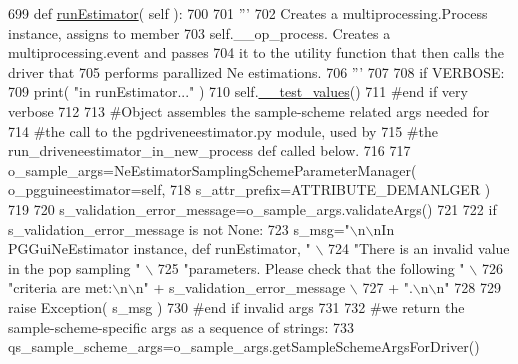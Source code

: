 \begin{DoxyCode}
699     \textcolor{keyword}{def }\hyperlink{classnegui_1_1pgguineestimator_1_1PGGuiNeEstimator_aa1ee1f0041f2dcce74e3e3ead41c9491}{runEstimator}( self ):
700 
701         \textcolor{stringliteral}{'''}
702 \textcolor{stringliteral}{        Creates a multiprocessing.Process instance, assigns to member}
703 \textcolor{stringliteral}{        self.\_\_op\_process.  Creates a multiprocessing.event and passes}
704 \textcolor{stringliteral}{        it to the utility function that then calls the driver that}
705 \textcolor{stringliteral}{        performs parallized Ne estimations.}
706 \textcolor{stringliteral}{        '''}
707 
708         \textcolor{keywordflow}{if} VERBOSE:
709             print( \textcolor{stringliteral}{"in runEstimator..."} )
710             self.\hyperlink{classnegui_1_1pgguineestimator_1_1PGGuiNeEstimator_a2e461e61411b94ca354e48963ffe3fe7}{\_\_test\_values}()
711         \textcolor{comment}{#end if very verbose}
712 
713         \textcolor{comment}{#Object assembles the sample-scheme related args needed for }
714         \textcolor{comment}{#the call to the pgdriveneestimator.py module, used by}
715         \textcolor{comment}{#the run\_driveneestimator\_in\_new\_process def called below.}
716 
717         o\_sample\_args=NeEstimatorSamplingSchemeParameterManager( o\_pgguineestimator=self, 
718                                                                     s\_attr\_prefix=ATTRIBUTE\_DEMANLGER )
719 
720         s\_validation\_error\_message=o\_sample\_args.validateArgs()
721 
722         \textcolor{keywordflow}{if} s\_validation\_error\_message \textcolor{keywordflow}{is} \textcolor{keywordflow}{not} \textcolor{keywordtype}{None}:
723             s\_msg=\textcolor{stringliteral}{"\(\backslash\)n\(\backslash\)nIn PGGuiNeEstimator instance, def runEstimator, "} \(\backslash\)
724                     \textcolor{stringliteral}{"There is an invalid value in the pop sampling "} \(\backslash\)
725                     \textcolor{stringliteral}{"parameters.  Please check that the following "} \(\backslash\)
726                     \textcolor{stringliteral}{"criteria are met:\(\backslash\)n\(\backslash\)n"} + s\_validation\_error\_message \(\backslash\)
727                     + \textcolor{stringliteral}{".\(\backslash\)n\(\backslash\)n"}
728         
729             \textcolor{keywordflow}{raise} Exception( s\_msg )
730         \textcolor{comment}{#end if invalid args}
731         
732         \textcolor{comment}{#we return the sample-scheme-specific args as a sequence of strings:}
733         qs\_sample\_scheme\_args=o\_sample\_args.getSampleSchemeArgsForDriver()

\end{DoxyCode}
